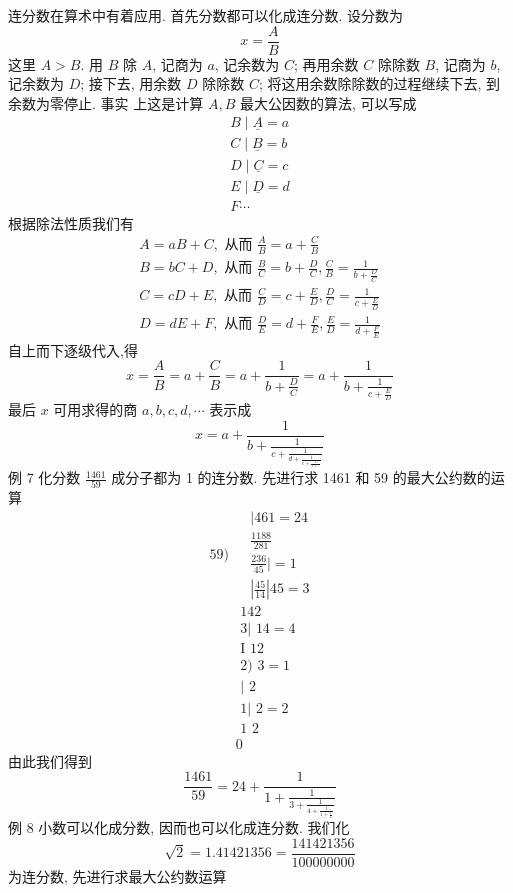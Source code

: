 连分数在算术中有着应用. 首先分数都可以化成连分数. 设分数为
\[
x=\frac{A}{B}
\]
这里 $A>B$. 用 $B$ 除 $A$, 记商为 $a$, 记余数为 $C$; 再用余数 $C$ 除除数 $B$, 记商为 $b$, 记余数为 $D$; 接下去, 用余数 $D$ 除除数 $C$; 将这用余数除除数的过程继续下去, 到余数为零停止. 事实 上这是计算 $A, B$ 最大公因数的算法, 可以写成
\[
\begin{gathered}
B \mid \underline{A}=a \\
C \mid \underline{B}=b \\
D \mid \underline{C}=c \\
E \mid \underline{D}=d \\
F \cdots
\end{gathered}
\]
根据除法性质我们有
\[
\begin{gathered}
A=a B+C, \text { 从而 } \frac{A}{B}=a+\frac{C}{B} \\
B=b C+D, \text { 从而 } \frac{B}{C}=b+\frac{D}{C}, \frac{C}{B}=\frac{1}{b+\frac{D}{C}} \\
C=c D+E, \text { 从而 } \frac{C}{D}=c+\frac{E}{D}, \frac{D}{C}=\frac{1}{c+\frac{E}{D}} \\
D=d E+F, \text { 从而 } \frac{D}{E}=d+\frac{F}{E}, \frac{E}{D}=\frac{1}{d+\frac{F}{E}}
\end{gathered}
\]
自上而下逐级代入,得
\[
x=\frac{A}{B}=a+\frac{C}{B}=a+\frac{1}{b+\frac{D}{C}}=a+\frac{1}{b+\frac{1}{c+\frac{E}{D}}}
\]
最后 $x$ 可用求得的商 $a, b, c, d, \cdots$ 表示成
\[
x=a+\frac{1}{b+\frac{1}{c+\frac{1}{d+\frac{1}{e+\frac{1}{f+\cdots}}}}}
\]
例 7 化分数 $\frac{1461}{59}$ 成分子都为 1 的连分数. 先进行求 1461 和 59 的最大公约数的运算
\[
\text { 59) } \begin{aligned}
& \mid 461=24 \\
& \frac{1188}{281} \\
& \frac{236}{45} \mid=1 \\
&\left|\frac{45}{14}\right| 45=3
\end{aligned}
\]
\[
\begin{aligned}
& \text { 142 } \\
& \text { 3| } 14=4 \\
& \text { I } 12 \\
& \text { 2) } 3=1 \\
& \text { | } 2 \\
& \text { 1| } 2=2 \\
& \text { 1 } 2 \\
& 0
\end{aligned}
\]
由此我们得到
\[
\frac{1461}{59}=24+\frac{1}{1+\frac{1}{3+\frac{1}{4+\frac{1}{1+\frac{1}{2}}}}}
\]
例 8 小数可以化成分数, 因而也可以化成连分数. 我们化
\[
\sqrt{2}=1.41421356=\frac{141421356}{100000000}
\]
为连分数, 先进行求最大公约数运算


